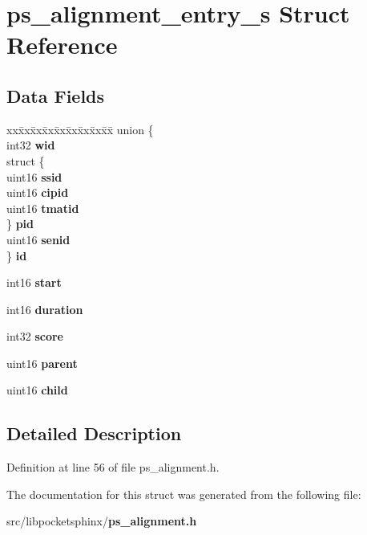 \section{ps\-\_\-alignment\-\_\-entry\-\_\-s Struct Reference}
\label{structps__alignment__entry__s}
\subsection*{Data Fields}
\begin{DoxyCompactItemize}
\item 
\begin{tabbing}
xx\=xx\=xx\=xx\=xx\=xx\=xx\=xx\=xx\=\kill
union \{\\
\>int32 {\bfseries wid}\\
\>struct \{\\
\>\>uint16 {\bfseries ssid}\\
\>\>uint16 {\bfseries cipid}\\
\>\>uint16 {\bfseries tmatid}\\
\>\} {\bfseries pid}\\
\>uint16 {\bfseries senid}\\
\} {\bfseries id}\label{structps__alignment__entry__s_a3c41870e66f6813e327a29c1d9b8d3bc}
\\

\end{tabbing}\item 
int16 {\bfseries start}\label{structps__alignment__entry__s_ac3b469463845542c8d29b7c6c4e0f29e}

\item 
int16 {\bfseries duration}\label{structps__alignment__entry__s_ad5559bb3e102d94e614d6b0357bda3ad}

\item 
int32 {\bfseries score}\label{structps__alignment__entry__s_aa43ae9ba4a890fa70c07606165ea4b87}

\item 
uint16 {\bfseries parent}\label{structps__alignment__entry__s_aef8dfacf69640a3ff88514298aa8f54a}

\item 
uint16 {\bfseries child}\label{structps__alignment__entry__s_a5f8b29052c7257a83af07018dddb7eff}

\end{DoxyCompactItemize}


\subsection{Detailed Description}


Definition at line 56 of file ps\-\_\-alignment.\-h.



The documentation for this struct was generated from the following file\-:\begin{DoxyCompactItemize}
\item 
src/libpocketsphinx/{\bf ps\-\_\-alignment.\-h}\end{DoxyCompactItemize}

